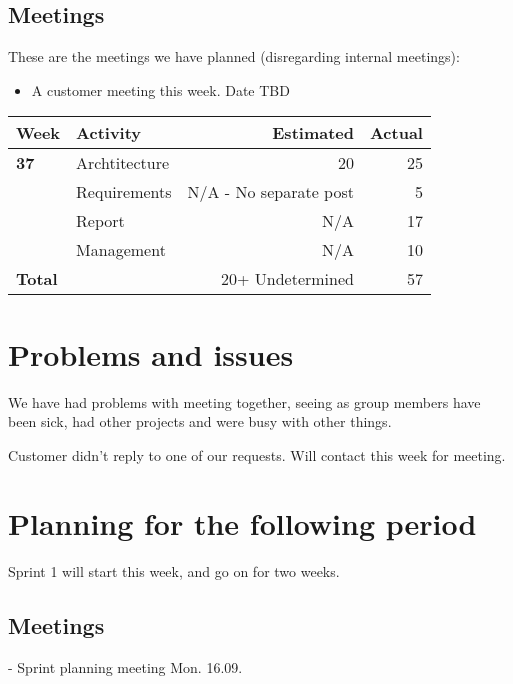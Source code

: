 \documentclass[12pt, a4paper]{article}
\begin{document}
\subsection{Meetings}
These are the meetings we have planned (disregarding internal meetings):\\
\begin{itemize}
\item A customer meeting this week. Date TBD
\end{itemize}
  \begin{tabular}{| l | l | r | r |}
    \hline
    \textbf{Week} & \textbf{Activity} & \textbf{Estimated} & \textbf{Actual}\\ \hline
    \textbf{37} & Archtitecture & 20 & 25 \\ \hline
     & Requirements & N/A - No separate post & 5 \\ \hline
     & Report & N/A & 17 \\ \hline
     & Management & N/A & 10 \\ \hline
     \textbf{Total }&  & 20+ Undetermined & 57 \\
    \hline
  \end{tabular}

\section{Problems and issues}
We have had problems with meeting together, seeing as group members have been sick, had other projects and were busy with other things.

Customer didn't reply to one of our requests. Will contact this week for meeting.

\section{Planning for the following period}
Sprint 1 will start this week, and go on for two weeks.
\subsection{Meetings}
- Sprint planning meeting Mon. 16.09.
\newpage
\end{document}
